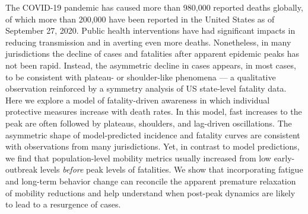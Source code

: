 The COVID-19 pandemic has caused more than 980,000 reported deaths globally, of which more than 200,000 have been reported in the United States as of September 27, 2020. 
Public health interventions have had significant impacts in reducing transmission and in averting even more deaths. 
Nonetheless, in many jurisdictions the decline of cases and fatalities after apparent epidemic peaks has not been rapid.  
Instead, the asymmetric decline in cases appears, in most cases, to be consistent with plateau- or shoulder-like phenomena --- a qualitative observation reinforced by a symmetry analysis of US state-level fatality data.  
Here we explore a model of fatality-driven awareness in which individual protective measures increase with death rates.  
In this model, fast increases to the peak are often followed by plateaus, shoulders, and lag-driven oscillations. 
The asymmetric shape of model-predicted incidence and fatality curves are consistent with observations from many jurisdictions. 
Yet, in contrast to model predictions, we find that population-level mobility metrics usually increased from low early-outbreak levels \emph{before} peak levels of fatalities.  
We show that incorporating fatigue and long-term behavior change can reconcile the apparent premature relaxation of mobility reductions and help understand when post-peak dynamics are likely to lead to a resurgence of cases.
